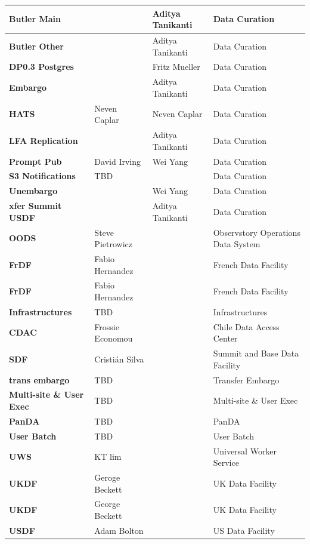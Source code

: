 \begin{longtable} {
|p{}   |p{}|p{} |p{}|}
{\textbf{Butler Main}} &  & Aditya Tanikanti & Data Curation \\ \hline
{\textbf{Butler Other}} &  & Aditya Tanikanti & Data Curation \\ \hline
{\textbf{DP0.3 Postgres}} &  & Fritz Mueller & Data Curation \\ \hline
{\textbf{Embargo}} &  & Aditya Tanikanti & Data Curation \\ \hline
{\textbf{HATS}} & Neven Caplar & Neven Caplar & Data Curation \\ \hline
{\textbf{LFA Replication}} &  & Aditya Tanikanti & Data Curation \\ \hline
{\textbf{Prompt Pub}} & David Irving & Wei Yang & Data Curation \\ \hline
{\textbf{S3 Notifications}} & TBD &  & Data Curation \\ \hline
{\textbf{Unembargo }} &  & Wei Yang & Data Curation \\ \hline
{\textbf{xfer Summit USDF}} &  & Aditya Tanikanti & Data Curation \\ \hline
{\textbf{OODS}} & Steve Pietrowicz &  & Observstory Operations Data System \\ \hline
{\textbf{FrDF}} & Fabio Hernandez &  & French Data Facility \\ \hline
{\textbf{FrDF}} & Fabio Hernandez &  & French Data Facility \\ \hline
{\textbf{Infrastructures}} & TBD &  & Infrastructures \\ \hline
{\textbf{CDAC}} & Frossie Economou &  & Chile Data Access Center \\ \hline
{\textbf{SDF}} & Cristián Silva &  & Summit and Base Data Facility \\ \hline
{\textbf{trans embargo}} & TBD &  & Transfer Embargo \\ \hline
{\textbf{Multi-site \&  User Exec}} & TBD &  & Multi-site \&  User Exec \\ \hline
{\textbf{PanDA}} & TBD &  & PanDA \\ \hline
{\textbf{User Batch}} & TBD &  & User Batch \\ \hline
{\textbf{UWS}} & KT lim &  & Universal Worker Service \\ \hline
{\textbf{UKDF}} & Geroge Beckett &  & UK Data Facility \\ \hline
{\textbf{UKDF}} & George Beckett &  & UK Data Facility \\ \hline
{\textbf{USDF}} & Adam Bolton &  & US Data Facility \\ \hline

\end{longtable}
